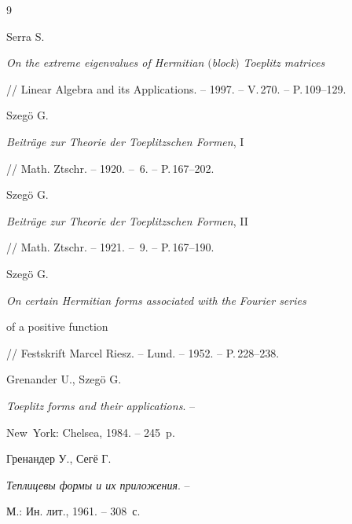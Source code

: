 \begin{thebibliography}{9}







Serra S.


{\em On the extreme eigenvalues of Hermitian $($block\/$)$ Toeplitz matrices}


// Linear Algebra and its Applications. -- 1997. -- V.\,270. -- P.\,109--129.




Szeg\"o G.


{\em Beitr\"age zur Theorie der Toeplitzschen Formen}, I


// Math. Ztschr. -- 1920. -- \No\,6. -- P.\,167--202.




Szeg\"o G.


{\em Beitr\"age zur Theorie der Toeplitzschen Formen}, II


// Math. Ztschr. -- 1921. -- \No\,9. -- P.\,167--190.




Szeg\"o G.


{\em On certain Hermitian forms associated with the Fourier series


of a positive function}


// Festskrift Marcel Riesz. -- Lund. -- 1952. -- P.\,228--238.




Grenander U., Szeg\"o G.


{\em Toeplitz forms and their applications}. --


New~York: Chelsea, 1984. -- 245~p.




Гренандер У., Сег\"е Г.


{\em Теплицевы формы и их приложения}. --


М.: Ин. лит., 1961. -- 308~с.





\end{thebibliography}





\vskip 2cm












\label{end}






